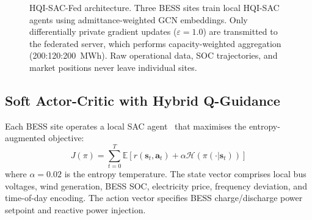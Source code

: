 \documentclass[journal]{IEEEtran}
\begin{document}
\begin{figure}[t]
\caption{HQI-SAC-Fed architecture. Three BESS sites train local
HQI-SAC agents using admittance-weighted GCN embeddings. Only
differentially private gradient updates ($\varepsilon=1.0$) are
transmitted to the federated server, which performs capacity-weighted
aggregation (200:120:200~MWh). Raw operational data, SOC trajectories,
and market positions never leave individual sites.}
\label{fig:architecture}
\end{figure}

\subsection{Soft Actor-Critic with Hybrid Q-Guidance}

Each BESS site operates a local SAC agent~\cite{haarnoja2018sac} that
maximises the entropy-augmented objective:
\begin{equation}
  J(\pi) = \sum_{t=0}^{T}
    \mathbb{E}\!\left[r(\mathbf{s}_t, \mathbf{a}_t) +
    \alpha\mathcal{H}(\pi(\cdot|\mathbf{s}_t))\right]
  \label{eq:sac}
\end{equation}
where $\alpha = 0.02$ is the entropy temperature. The state vector
comprises local bus voltages, wind generation, BESS SOC, electricity
price, frequency deviation, and time-of-day encoding. The action vector
specifies BESS charge/discharge power setpoint and reactive power injection.
\end{document}
